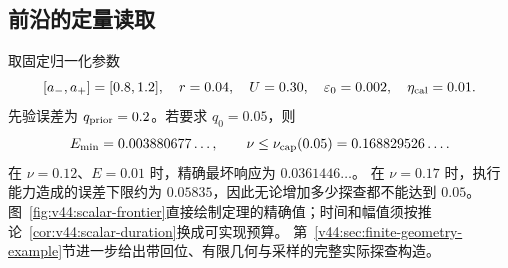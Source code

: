 \documentclass[11pt,a4paper]{article}
\numberwithin{equation}{section}
\theoremstyle{definition}
\begin{document}
\subsection{前沿的定量读取}
取固定归一化参数
\[
 [a_-,a_+]=[0.8,1.2],\quad r=0.04,\quad U=0.30,
 \quad\varepsilon_0=0.002,\quad\eta_{\rm cal}=0.01.
\]
先验误差为 $q_{\rm prior}=0.2$。若要求 $q_0=0.05$，则
\[
 E_{\min}=0.003880677\ldots,
 \qquad \nu\le\nu_{\rm cap}(0.05)=0.168829526\ldots.
\]
在 $\nu=0.12$、$E=0.01$ 时，精确最坏响应为 $0.0361446\ldots$。
在 $\nu=0.17$ 时，执行能力造成的误差下限约为 $0.05835$，因此无论增加多少探查都不能达到 $0.05$。
图~\ref{fig:v44:scalar-frontier}直接绘制定理的精确值；时间和幅值须按推论~\ref{cor:v44:scalar-duration}换成可实现预算。
第~\ref{v44:sec:finite-geometry-example}节进一步给出带回位、有限几何与采样的完整实际探查构造。
\end{document}
